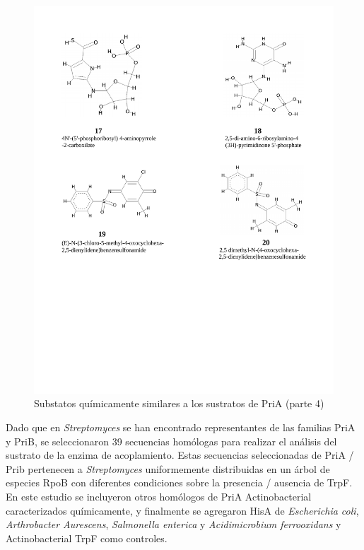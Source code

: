 \documentclass[12pt,twoside]{reedthesis}
\begin{document}
  \begin{figure}[h!tbp]
  \centering
  \includegraphics[angle = 0,scale = .8]{chapter4/esquema_quimico-4-4.pdf}
  \caption[Substatos químicamente similares a los sustratos de PriA (parte 4)]{\footnotesize{Substatos químicamente similares a los sustratos de PriA (parte 4)}}
  \label{fig:Substrates4}
  \end{figure}
  
  Dado que en \emph{Streptomyces} se han encontrado representantes de las
  familias PriA y PriB, se seleccionaron 39 secuencias homólogas para
  realizar el análisis del sustrato de la enzima de acoplamiento. Estas
  secuencias seleccionadas de PriA / Prib pertenecen a \emph{Streptomyces}
  uniformemente distribuidas en un árbol de especies RpoB con diferentes
  condiciones sobre la presencia / ausencia de TrpF. En este estudio se
  incluyeron otros homólogos de PriA Actinobacterial caracterizados
  químicamente, y finalmente se agregaron HisA de \emph{Escherichia coli},
  \emph{Arthrobacter Aurescens}, \emph{Salmonella enterica} y
  \emph{Acidimicrobium ferrooxidans} y Actinobacterial TrpF como
  controles.
  
\end{document}
